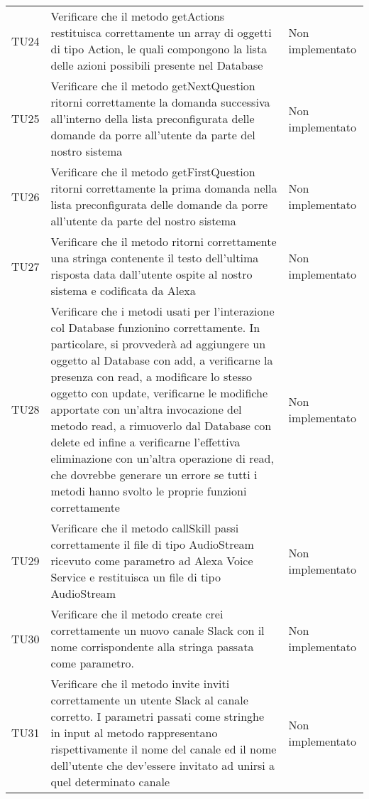 \documentclass[../PianoDiQualifica.tex]{subfiles}
\begin{document}
\begin{longtable}[c] { >{\centering\arraybackslash}p{4cm} p{7cm} >{\centering\arraybackslash}p{4cm}}
			\addlinespace[0.3em]
			\midrule
			\addlinespace[0.3em]
			TU24 & Verificare che il metodo getActions restituisca correttamente un array di oggetti di tipo Action, le quali compongono la lista delle azioni possibili presente nel Database & Non implementato \\ 
			\addlinespace[0.3em]
			\midrule
			\addlinespace[0.3em]
			TU25 & Verificare che il metodo getNextQuestion ritorni correttamente la domanda successiva all'interno della lista preconfigurata delle domande da porre all'utente da parte del nostro sistema & Non implementato \\ 
			\addlinespace[0.3em]
			\midrule
			\addlinespace[0.3em]
			TU26 & Verificare che il metodo getFirstQuestion ritorni correttamente la prima domanda nella lista preconfigurata delle domande da porre all'utente da parte del nostro sistema & Non implementato \\ 
			\addlinespace[0.3em]
			\midrule
			\addlinespace[0.3em]
			TU27 & Verificare che il metodo ritorni correttamente una stringa contenente il testo dell'ultima risposta data dall'utente ospite al nostro sistema e codificata da Alexa & Non implementato \\ 
			\addlinespace[0.3em]
			\midrule
			\addlinespace[0.3em]
			TU28 & Verificare che i metodi usati per l'interazione col Database funzionino correttamente. In particolare, si provvederà ad aggiungere un oggetto al Database con add, a verificarne la presenza con read, a modificare lo stesso oggetto con update, verificarne le modifiche apportate con un'altra invocazione del metodo read, a rimuoverlo dal Database con delete ed infine a verificarne l'effettiva eliminazione con un'altra operazione di read, che dovrebbe generare un errore se tutti i metodi hanno svolto le proprie funzioni correttamente & Non implementato \\ 
			\addlinespace[0.3em]
			\midrule
			\addlinespace[0.3em]
			TU29 & Verificare che il metodo callSkill passi correttamente il file di tipo AudioStream ricevuto come parametro ad Alexa Voice Service e restituisca un file di tipo AudioStream & Non implementato \\ 
			\addlinespace[0.3em]
			\midrule
			\addlinespace[0.3em]
			TU30 & Verificare che il metodo create crei correttamente un nuovo canale Slack con il nome corrispondente alla stringa passata come parametro. & Non implementato \\ 
			\addlinespace[0.3em]
			\midrule
			\addlinespace[0.3em]
			TU31 & Verificare che il metodo invite inviti correttamente un utente Slack al canale corretto. I parametri passati come stringhe in input al metodo rappresentano rispettivamente il nome del canale ed il nome dell'utente che dev'essere invitato ad unirsi a quel determinato canale & Non implementato \\

\end{longtable}
\end{document}

